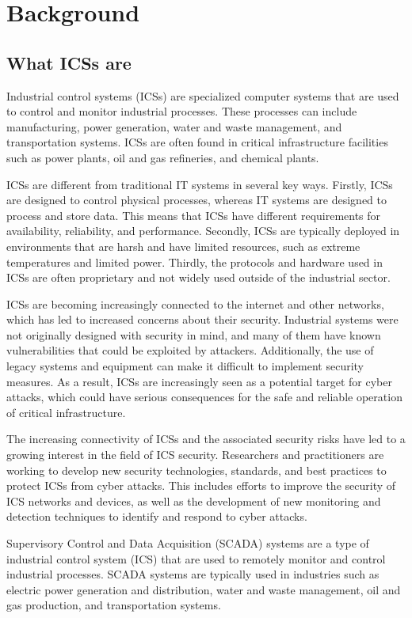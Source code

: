 \chapter{Background}
\label{background}

\section{What ICSs are}
Industrial control systems (ICSs) are specialized computer systems that are used to control and monitor industrial processes. These processes can include manufacturing, power generation, water and waste management, and transportation systems. ICSs are often found in critical infrastructure facilities such as power plants, oil and gas refineries, and chemical plants.

ICSs are different from traditional IT systems in several key ways. Firstly, ICSs are designed to control physical processes, whereas IT systems are designed to process and store data. This means that ICSs have different requirements for availability, reliability, and performance. Secondly, ICSs are typically deployed in environments that are harsh and have limited resources, such as extreme temperatures and limited power. Thirdly, the protocols and hardware used in ICSs are often proprietary and not widely used outside of the industrial sector.

ICSs are becoming increasingly connected to the internet and other networks, which has led to increased concerns about their security. Industrial systems were not originally designed with security in mind, and many of them have known vulnerabilities that could be exploited by attackers. Additionally, the use of legacy systems and equipment can make it difficult to implement security measures. As a result, ICSs are increasingly seen as a potential target for cyber attacks, which could have serious consequences for the safe and reliable operation of critical infrastructure.

The increasing connectivity of ICSs and the associated security risks have led to a growing interest in the field of ICS security. Researchers and practitioners are working to develop new security technologies, standards, and best practices to protect ICSs from cyber attacks. This includes efforts to improve the security of ICS networks and devices, as well as the development of new monitoring and detection techniques to identify and respond to cyber attacks.

Supervisory Control and Data Acquisition (SCADA) systems are a type of industrial control system (ICS) that are used to remotely monitor and control industrial processes. SCADA systems are typically used in industries such as electric power generation and distribution, water and waste management, oil and gas production, and transportation systems.

